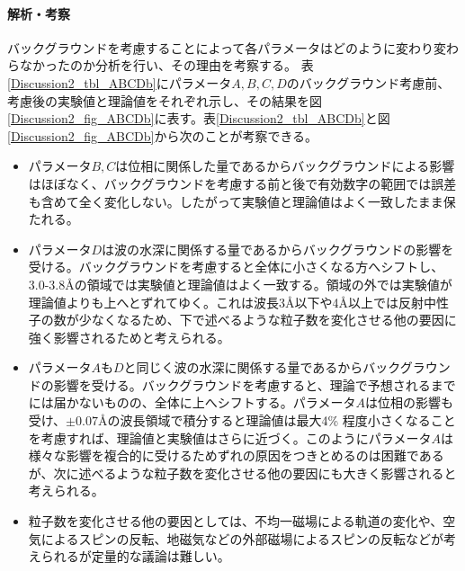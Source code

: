 \paragraph{解析・考察}
バックグラウンドを考慮することによって各パラメータはどのように変わり変わらなかったのか分析を行い、その理由を考察する。
表\ref{Discussion2_tbl_ABCDb}にパラメータ$A,B,C,D$のバックグラウンド考慮前、考慮後の実験値と理論値をそれぞれ示し、その結果を図\ref{Discussion2_fig_ABCDb}に表す。表\ref{Discussion2_tbl_ABCDb}と図\ref{Discussion2_fig_ABCDb}から次のことが考察できる。
\begin{itemize}
\item パラメータ$B,C$は位相に関係した量であるからバックグラウンドによる影響はほぼなく、バックグラウンドを考慮する前と後で有効数字の範囲では誤差も含めて全く変化しない。したがって実験値と理論値はよく一致したまま保たれる。
\item パラメータ$D$は波の水深に関係する量であるからバックグラウンドの影響を受ける。バックグラウンドを考慮すると全体に小さくなる方へシフトし、3.0-3.8\AA の領域では実験値と理論値はよく一致する。領域の外では実験値が理論値よりも上へとずれてゆく。これは波長3\AA 以下や4\AA 以上では反射中性子の数が少なくなるため、下で述べるような粒子数を変化させる他の要因に強く影響されるためと考えられる。
\item パラメータ$A$も$D$と同じく波の水深に関係する量であるからバックグラウンドの影響を受ける。バックグラウンドを考慮すると、理論で予想されるまでには届かないものの、全体に上へシフトする。パラメータ$A$は位相の影響も受け、$\pm 0.07$\AA の波長領域で積分すると理論値は最大4\% 程度小さくなることを考慮すれば、理論値と実験値はさらに近づく。このようにパラメータ$A$は様々な影響を複合的に受けるためずれの原因をつきとめるのは困難であるが、次に述べるような粒子数を変化させる他の要因にも大きく影響されると考えられる。
\item 粒子数を変化させる他の要因としては、不均一磁場による軌道の変化や、空気によるスピンの反転、地磁気などの外部磁場によるスピンの反転などが考えられるが定量的な議論は難しい。
\end{itemize}


